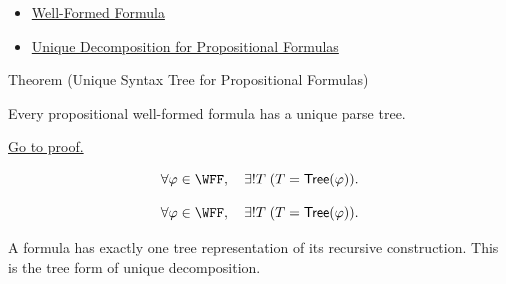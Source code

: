 \begin{dependencies}
\begin{itemize}
  \item \hyperref[def:well-formed-formula]{Well-Formed Formula}
  \item \hyperref[thm:unique-decomposition-propositional-formulas]{Unique Decomposition for Propositional Formulas}
\end{itemize}
\end{dependencies}
\begin{theorembox}{Theorem (Unique Syntax Tree for Propositional Formulas)}
\begin{theorem}
\label{thm:unique-syntax-tree-propositional-formulas}
Every propositional well-formed formula has a unique parse tree.

\noindent\hyperref[prf:unique-syntax-tree-propositional-formulas]{Go to proof.}
\end{theorem}
\end{theorembox}
\begin{remark*}
\[
\forall\varphi\in\WFF,\quad \exists!T\; (T=\mathsf{Tree}(\varphi)).
\]
\end{remark*}

\begin{remark*}
\[
  \forall\varphi\in\WFF,\quad \exists!T\; (T=\mathsf{Tree}(\varphi)).
\]
\end{remark*}




\begin{remark*}[Interpretation]
A formula has exactly one tree representation of its recursive construction. This is the tree form of unique decomposition.
\end{remark*}

